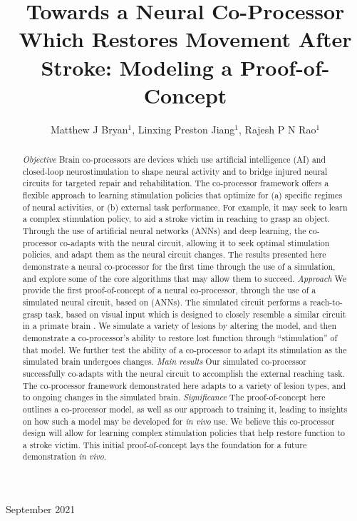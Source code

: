 \documentclass[12pt]{iopart}
\begin{document}
\title[Modeling a Neural Co-Processor]
{Towards a Neural Co-Processor Which Restores Movement After Stroke: Modeling a Proof-of-Concept}

\author{Matthew J Bryan$^{1}$, Linxing Preston Jiang$^{1}$, Rajesh P N Rao$^{1}$}

\address{$^{1}$ Neural Systems Laboratory, Department of Computer
Science and Engineering, University of Washington, Box 352350,
Seattle, WA 98105, USA}

\vspace{10pt}
\begin{indented}
\item[]September 2021
\end{indented}

\begin{abstract}
\textit{Objective} Brain co-processors\cite{rao.coproc} are devices which use artificial
intelligence (AI) and closed-loop neurostimulation to shape neural activity and to bridge
injured neural circuits for targeted repair and rehabilitation. The co-processor framework
offers a flexible approach to learning stimulation policies that optimize for
(a) specific regimes of neural activities, or (b) external task performance.
For example, it may seek to learn a complex stimulation policy, to aid a
stroke victim in reaching to grasp an object.
Through the use of artificial neural networks (ANNs) and deep learning, the
co-processor co-adapts with the neural circuit, allowing it to seek optimal
stimulation policies, and adapt them as the neural circuit changes. The results
presented here demonstrate a neural co-processor for the first time through
the use of a simulation, and explore some of the core algorithms that may allow them
to succeed. \textit{Approach} We provide the first proof-of-concept of a neural
co-processor, through the use of a simulated neural circuit, based on (ANNs).
The simulated circuit performs a reach-to-grasp task, based on visual
input which is designed to closely resemble a similar circuit in a primate brain
\cite{michaels.mrnn}. We simulate a variety of lesions by altering the model, and
then demonstrate a co-processor's ability to restore lost function through
``stimulation'' of that model. We further test the ability of a
co-processor to adapt its stimulation as the simulated brain
undergoes changes. \textit{Main results} Our simulated co-processor
successfully co-adapts with the neural circuit to accomplish the external reaching
task. The co-processor framework demonstrated here adapts to a variety of lesion
types, and to ongoing changes in the simulated brain. \textit{Significance} The proof-of-concept here
outlines a co-processor model, as well as our approach to training it, leading to
insights on how such a model may be developed for \textit{in vivo} use. We believe this
co-processor design will allow for learning complex stimulation policies that
help restore function to a stroke victim. This initial proof-of-concept lays
the foundation for a future demonstration \textit{in vivo}.
\end{abstract}
\end{document}
